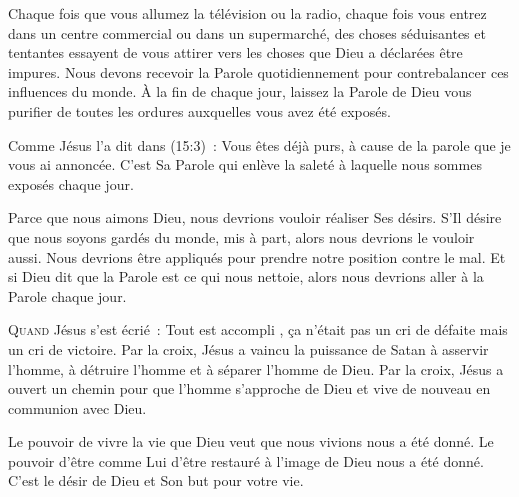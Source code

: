 
Chaque fois que vous allumez la télévision ou la radio,
 chaque fois vous entrez dans un centre commercial ou dans un supermarché,
 des choses séduisantes et tentantes essayent de vous attirer
 vers les choses que Dieu a déclarées être impures.
 Nous devons recevoir la Parole quotidiennement pour contrebalancer
 ces influences du monde. À la fin de chaque jour,
 laissez la Parole de Dieu vous purifier de toutes les ordures
 auxquelles vous avez été exposés.

Comme Jésus l'a dit dans (15:3)~: 
 \og Vous êtes déjà purs, à cause de la parole que je vous ai annoncée. \fg{}
 C'est Sa Parole qui enlève la saleté à laquelle nous sommes exposés chaque jour.

Parce que nous aimons Dieu, nous devrions vouloir réaliser Ses désirs.
 S'Il désire que nous soyons gardés du monde, mis à part,
 alors nous devrions le vouloir aussi. Nous devrions être appliqués
 pour prendre notre position contre le mal.
 Et si Dieu dit que la Parole est ce qui nous nettoie,
 alors nous devrions aller à la Parole chaque jour.

\dvrule






\lettrine{Q}{uand} Jésus s'est écrié~: 
 \og Tout est accompli \fg{}, ça n'était pas un cri de défaite
 mais un cri de victoire. Par la croix, Jésus a vaincu la puissance
 de Satan à asservir l'homme, à détruire l'homme et à séparer l'homme de Dieu.
 Par la croix, Jésus a ouvert un chemin pour que l'homme
 s'approche de Dieu et vive de nouveau en communion avec Dieu.

Le pouvoir de vivre la vie que Dieu veut que nous vivions nous a été donné.
 Le pouvoir d'être comme Lui \ocadr d'être restauré à l'image de Dieu \fcadr{}
 nous a été donné. C'est le désir de Dieu et Son but pour votre vie.


